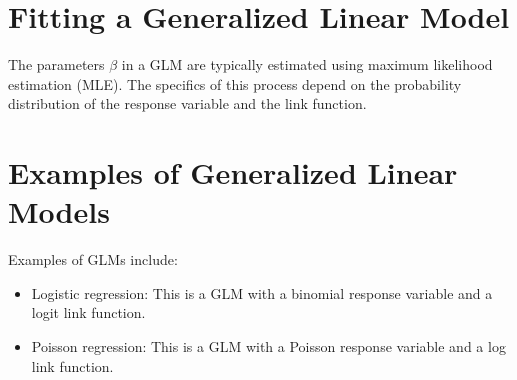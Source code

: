 \section{Fitting a Generalized Linear Model}

The parameters $\beta$ in a GLM are typically estimated using maximum
likelihood estimation (MLE). The specifics of this process depend on
the probability distribution of the response variable and the link
function.

\section{Examples of Generalized Linear Models}

Examples of GLMs include:

\begin{itemize}
    \item Logistic regression: This is a GLM with a binomial response variable and a logit link function.
    \item Poisson regression: This is a GLM with a Poisson response variable and a log link function.
\end{itemize}
